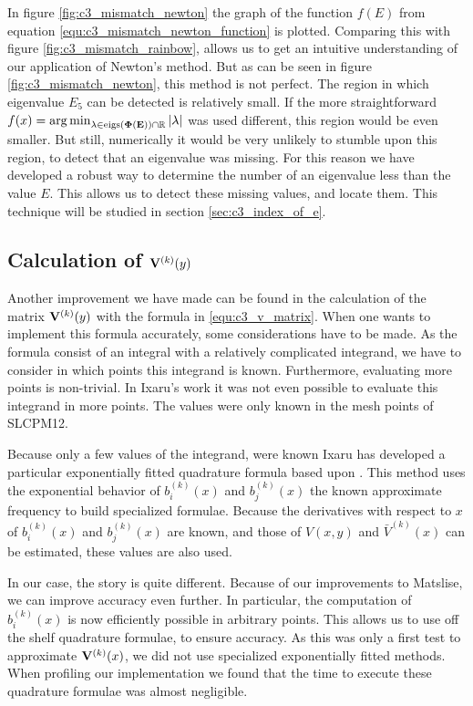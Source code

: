 In figure \ref{fig:c3_mismatch_newton} the graph of the function $f(E)$ from equation \eqref{equ:c3_mismatch_newton_function} is plotted. Comparing this with figure \ref{fig:c3_mismatch_rainbow}, allows us to get an intuitive understanding of our application of Newton's method. But as can be seen in figure \ref{fig:c3_mismatch_newton}, this method is not perfect. The region in which eigenvalue $E_5$ can be detected is relatively small. If the more straightforward $f(x) = \operatorname*{arg\,min}_{\lambda \in \operatorname{eigs}(\vb{\Phi(E)}) \cap \mathbb{R}} \left|\lambda\right|$ was used different, this region would be even smaller. But still, numerically it would be very unlikely to stumble upon this region, to detect that an eigenvalue was missing. For this reason we have developed a robust way to determine the number of an eigenvalue less than the value $E$. This allows us to detect these missing values, and locate them. This technique will be studied in section \ref{sec:c3_index_of_e}.

\subsection{Calculation of \texorpdfstring{$\vb{V}^{(k)}(y)$}{Vk(y)}}\label{sec:c3_calculate_vk}

Another improvement we have made can be found in the calculation of the matrix $\vb{V}^{(k)}(y)$ with the formula in \eqref{equ:c3_v_matrix}. When one wants to implement this formula accurately, some considerations have to be made. As the formula consist of an integral with a relatively complicated integrand, we have to consider in which points this integrand is known. Furthermore, evaluating more points is non-trivial. In Ixaru's work \cite{ixaru_new_2010} it was not even possible to evaluate this integrand in more points. The values were only known in the mesh points of SLCPM12.

Because only a few values of the integrand, were known Ixaru has developed a particular exponentially fitted quadrature formula based upon \cite[Section~2.4]{ixaru_exponential_2004}. This method uses the exponential behavior of $b_i^{(k)}(x)$ and $b_j^{(k)}(x)$ the known approximate frequency to build specialized formulae. Because the derivatives with respect to $x$ of $b_i^{(k)}(x)$ and $b_j^{(k)}(x)$ are known, and those of $V(x, y)$ and $\bar{V}^{(k)}(x)$ can be estimated, these values are also used.

In our case, the story is quite different. Because of our improvements to Matslise, we can improve accuracy even further. In particular, the computation of $b_i^{(k)}(x)$ is now efficiently possible in arbitrary points. This allows us to use off the shelf quadrature formulae, to ensure accuracy. As this was only a first test to approximate $\vb{V}^{(k)}(x)$, we did not use specialized exponentially fitted methods. When profiling our implementation we found that the time to execute these quadrature formulae was almost negligible.

